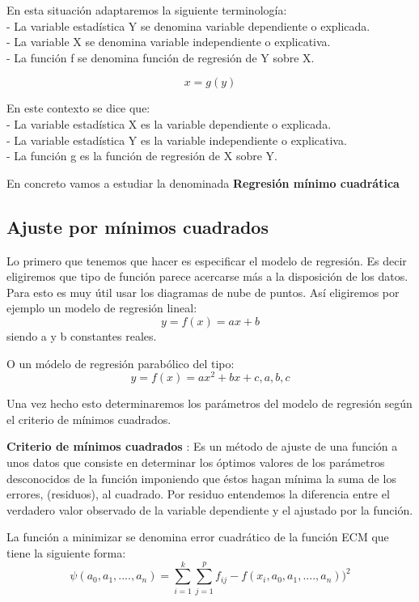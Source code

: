 \documentclass{article}
\begin{document}
	En esta situación adaptaremos la siguiente terminología:\\
		- La variable estadística Y se denomina variable dependiente o explicada.\\
		- La variable X se denomina variable independiente o explicativa.\\
		- La función f se denomina función de regresión de Y sobre X.
		
	$$ x = g(y) $$
	
	En este contexto se dice que:\\
		- La variable estadística X es la variable dependiente o explicada.\\
		- La variable estadística Y es la variable independiente o explicativa.\\
		- La función g es la función de regresión de X sobre Y.
		
	En concreto vamos a estudiar la denominada \textbf{Regresión mínimo cuadrática} 
	
	\subsection{Ajuste por mínimos cuadrados}
	
	Lo primero que tenemos que hacer es especificar el modelo de regresión. Es decir eligiremos que tipo de función parece acercarse más a la disposición de los datos. Para esto es muy útil usar los diagramas de nube de puntos. Así eligiremos por ejemplo un modelo de regresión lineal: $$ y = f(x) = ax + b $$ siendo a y b constantes reales.
	
	O un módelo de regresión parabólico del tipo:
	$$ y = f(x) = ax^2 +bx + c, a,b,c $$
	
	Una vez hecho esto determinaremos los parámetros del modelo de regresión según el criterio de mínimos cuadrados.
	\vspace{2mm}
	
	
	\textbf{Criterio de mínimos cuadrados} : Es un método de ajuste de una función a unos datos que consiste en determinar los óptimos valores de los parámetros desconocidos de la función imponiendo que éstos hagan mínima la suma de los errores, (residuos), al cuadrado. Por residuo entendemos la diferencia entre el verdadero valor observado de la variable dependiente y el ajustado por la función.
	\vspace{2mm}
	
	 La función a minimizar se denomina error cuadrático de la función ECM que tiene la siguiente forma:
	 $$\psi (a_0,a_1,....,a_n) = \sum_{i=1}^k \sum_{j=1}^p f_{ij} - f(x_i,a_0,a_1,....,a_n))^2 $$
	
\end{document}
